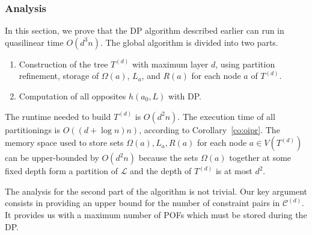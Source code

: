 \documentclass{article}
\begin{document}
\subsubsection{Analysis} \label{subsubsec:analysis_wopp}

In this section, we prove that the DP algorithm described earlier can run in quasilinear time $O(d^3n)$. The global algorithm is divided into two parts.
\begin{enumerate}
\item Construction of the tree $T^{(d)}$ with maximum layer $d$, using partition refinement, storage of $\Omega(a)$, $L_a$, and $R(a)$ for each node $a$ of $T^{(d)}$.
\item Computation of all opposites $h(a_0,L)$ with DP.
\end{enumerate}
The runtime needed to build $T^{(d)}$ is $O(d^2n)$. The execution time of all partitionings is $O((d+\log n)n)$, according to Corollary~\ref{co:oipr}.
The memory space used to store sets $\Omega(a),L_a,R(a)$ for each node $a\in V(T^{(d)})$ can be upper-bounded by $O(d^2n)$ because the sets $\Omega(a)$ together at some fixed depth form a partition of $\mathcal{L}$ and the depth of $T^{(d)}$ is at most $d^2$.

The analysis for the second part of the algorithm is not trivial. Our key argument consists in providing an upper bound for the number of constraint pairs in $\mathcal{C}^{(d)}$. It provides us with a maximum number of POFs which must be stored during the DP.
\end{document}
